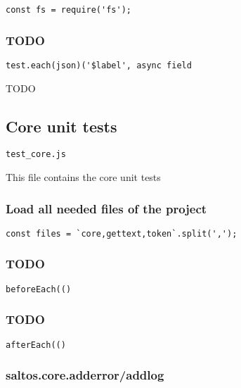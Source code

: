 \documentclass[a4paper]{article}
\begin{document}
\begin{lstlisting}
const fs = require('fs');
\end{lstlisting}

\hypertarget{toc479}{}
\subsubsection{TODO}

\begin{lstlisting}
test.each(json)('$label', async field
\end{lstlisting}

TODO

\hypertarget{toc480}{}
\subsection{Core unit tests}

\begin{lstlisting}
test_core.js
\end{lstlisting}

This file contains the core unit tests

\hypertarget{toc481}{}
\subsubsection{Load all needed files of the project}

\begin{lstlisting}
const files = `core,gettext,token`.split(',');
\end{lstlisting}

\hypertarget{toc482}{}
\subsubsection{TODO}

\begin{lstlisting}
beforeEach(()
\end{lstlisting}

\hypertarget{toc483}{}
\subsubsection{TODO}

\begin{lstlisting}
afterEach(()
\end{lstlisting}

\hypertarget{toc484}{}
\subsubsection{saltos.core.adderror/addlog}
\end{document}
